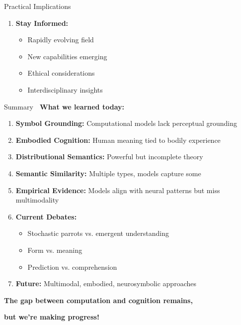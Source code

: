 \documentclass[aspectratio=169]{beamer}
\begin{document}
\begin{frame}[shrink=10]{Practical Implications 💼}
\begin{enumerate}
    \item \textbf{Stay Informed:}
    \begin{itemize}\setlength{\itemsep}{0pt}
        \item Rapidly evolving field
        \item New capabilities emerging
        \item Ethical considerations
        \item Interdisciplinary insights
    \end{itemize}
\end{enumerate}
\end{frame}

\begin{frame}[shrink=10]{Summary 🎯}
\textbf{What we learned today:}

\begin{enumerate}\setlength{\itemsep}{0pt}
    \item \textbf{Symbol Grounding:} Computational models lack perceptual grounding

    \item \textbf{Embodied Cognition:} Human meaning tied to bodily experience

    \item \textbf{Distributional Semantics:} Powerful but incomplete theory

    \item \textbf{Semantic Similarity:} Multiple types, models capture some

    \item \textbf{Empirical Evidence:} Models align with neural patterns but miss multimodality

    \item \textbf{Current Debates:}
    \begin{itemize}\setlength{\itemsep}{0pt}
        \item Stochastic parrots vs. emergent understanding
        \item Form vs. meaning
        \item Prediction vs. comprehension
    \end{itemize}

    \item \textbf{Future:} Multimodal, embodied, neurosymbolic approaches
\end{enumerate}

\vspace{1em}

\begin{center}
\Large
\textbf{The gap between computation and cognition remains,}

\textbf{but we're making progress! 🌉}
\end{center}
\end{frame}
\end{document}
